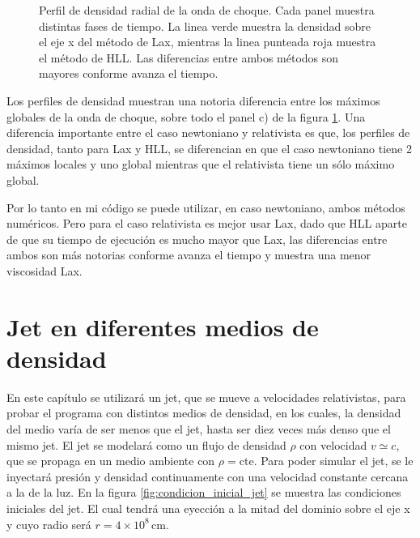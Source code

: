 \documentclass[12pt,a4paper]{book}
\begin{document}
\begin{figure}
\caption{\label{fig:perfil_de_densidad_radial_relativista}Perfil de densidad radial de la onda de choque. Cada panel muestra distintas fases de tiempo. La linea verde muestra la densidad sobre el eje x del método de Lax, mientras la linea punteada roja muestra el método de HLL. Las diferencias entre ambos métodos son mayores conforme avanza el tiempo.}
\end{figure}

Los perfiles de densidad muestran una notoria diferencia entre los máximos globales de la onda de choque, sobre todo el panel c) de la figura \ref{fig:perfil_de_densidad_radial_relativista}. Una diferencia importante entre el caso newtoniano y relativista es que, los perfiles de densidad, tanto para Lax y HLL, se diferencian en que el caso newtoniano tiene 2 máximos locales y uno global mientras que el relativista tiene un sólo máximo global.

Por lo tanto en mi código se puede utilizar, en caso newtoniano, ambos métodos numéricos. Pero para el caso relativista es mejor usar Lax, dado que HLL aparte de que su tiempo de ejecución es mucho mayor que Lax, las diferencias entre ambos son más notorias conforme avanza el tiempo y muestra una menor viscosidad Lax. 




\chapter{Jet en diferentes medios de densidad}

En este capítulo se utilizará un jet, que se mueve a velocidades relativistas, para probar el programa con distintos medios de densidad, en los cuales, la densidad del medio varía de ser menos que el jet, hasta ser diez veces más denso que el mismo jet.
El jet  se modelará como un flujo de densidad $\rho$ con velocidad $v \simeq c$, que se propaga en un medio ambiente con $\rho = \mathrm{cte}$. Para poder simular el jet, se le inyectará presión y densidad continuamente con una velocidad constante cercana a la de la luz. En la figura \ref{fig:condicion_inicial_jet} se muestra las condiciones iniciales del jet. El cual tendrá una eyección a la mitad del dominio sobre el eje x y cuyo radio será $r = 4 \times 10^{8} \, \mathrm{cm}$.
\end{document}
